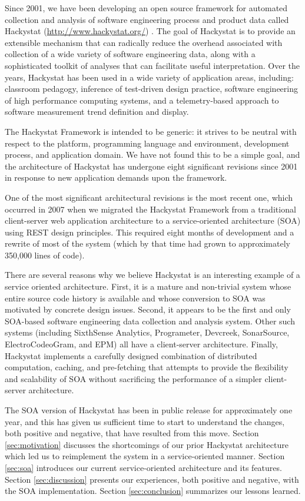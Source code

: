 \documentclass[conference,compsoc]{IEEEtran}
\begin{document}
Since 2001, we have been developing an open source framework for automated
collection and analysis of software engineering process and product data
called Hackystat (\url{http://www.hackystat.org/})
\cite{csdl2-06-06,csdl2-02-07}.  The goal of Hackystat is to provide an
extensible mechanism that can radically reduce the overhead associated with
collection of a wide variety of software engineering data, along with a
sophisticated toolkit of analyses that can facilitate useful
interpretation.  Over the years, Hackystat has been used in a wide variety
of application areas, including: classroom pedagogy,
inference of test-driven design practice, software
engineering of high performance computing systems, and a
telemetry-based approach to software measurement trend definition and
display.

The Hackystat Framework is intended to be generic: it strives to be neutral
with respect to the platform, programming language and environment,
development process, and application domain.  We have not found this to be
a simple goal, and the architecture of Hackystat has undergone eight
significant revisions since 2001 in response to new application demands
upon the framework.

One of the most significant architectural revisions is the most
recent one, which occurred in 2007 when we migrated the Hackystat Framework
from a traditional client-server web application architecture to a
service-oriented architecture (SOA) using REST design principles.  This
required eight months of development and a rewrite of most of the system
(which by that time had grown to approximately 350,000 lines of code).

There are several reasons why we believe Hackystat is an interesting
example of a service oriented architecture.  First, it is a mature and
non-trivial system whose entire source code history is available and whose
conversion to SOA was motivated by concrete design issues.  Second, it
appears to be the first and only SOA-based software engineering data
collection and analysis system.  Other such systems (including SixthSense
Analytics, Programeter, Devcreek, SonarSource, ElectroCodeoGram, and EPM)
all have a client-server architecture.  Finally, Hackystat implements a
carefully designed combination of distributed computation, caching, and
pre-fetching that attempts to provide the flexibility and scalability of
SOA without sacrificing the performance of a simpler client-server
architecture.

The SOA version of Hackystat has been in public release for approximately
one year, and this has given us sufficient time to start to understand the
changes, both positive and negative, that have resulted from this move.
Section \ref{sec:motivation} discusses the shortcomings of our prior
Hackystat architecture which led us to reimplement the system in a
service-oriented manner.  Section \ref{sec:soa} introduces our current
service-oriented architecture and its features.  Section
\ref{sec:discussion} presents our experiences, both positive and negative,
with the SOA implementation.  Section \ref{sec:conclusion} summarizes our
lessons learned.
\end{document}
